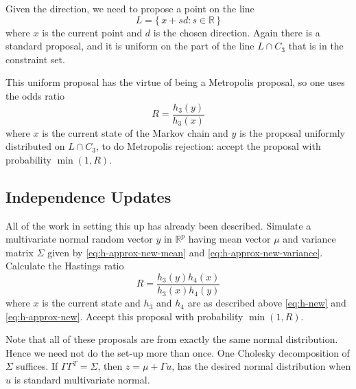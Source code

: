 \documentclass[11pt]{article}
\newcommand{\real}{\mathbb{R}}
\newcommand{\set}[1]{\{\, #1 \,\}}
\begin{document}
Given the direction, we need to propose a point on the line
$$
   L = \set{ x + s d : s \in \real }
$$
where $x$ is the current point and $d$ is the chosen direction.  Again
there is a standard proposal, and it is uniform on the part of the line
$L \cap C_3$ that is in the constraint set.

This uniform proposal has the virtue of being a Metropolis proposal,
so one uses the odds ratio
$$
   R = \frac{h_3(y)}{h_3(x)}
$$
where $x$ is the current state of the Markov chain and $y$ is the proposal
uniformly distributed on $L \cap C_3$, to do Metropolis rejection: accept
the proposal with probability $\min(1, R)$.

\subsection{Independence Updates}

All of the work in setting this up has already been described.  Simulate
a multivariate normal random vector $y$ in $\real^p$ having mean vector $\mu$
and variance matrix $\Sigma$ given by \eqref{eq:h-approx-new-mean}
and \eqref{eq:h-approx-new-variance}.  Calculate the Hastings ratio
$$
    R = \frac{h_3(y) h_4(x)}{h_3(x) h_4(y)}
$$
where $x$ is the current state and $h_3$ and $h_4$ are as described above
\eqref{eq:h-new} and \eqref{eq:h-approx-new}.  Accept this proposal
with probability $\min(1, R)$.

Note that all of these proposals are from exactly the same normal distribution.
Hence we need not do the set-up more than once.  One Cholesky decomposition
of $\Sigma$ suffices.  If $\Gamma \Gamma^T = \Sigma$,
then $z = \mu + \Gamma u$, has the desired normal distribution when $u$
is standard multivariate normal.
\end{document}
